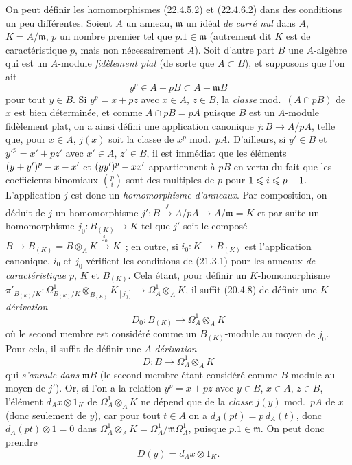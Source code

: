 \begin{remark}[22.4.8]
\label{0.22.4.8-fr}
On peut définir les homomorphismes (22.4.5.2) et (22.4.6.2) dans des conditions
un peu différentes. Soient $A$ un anneau, $\mathfrak m$ un idéal \emph{de carré
nul} dans $A$, $K=A/\mathfrak m$, $p$ un nombre premier tel que
$p.1\in\mathfrak m$ (autrement dit $K$ est de caractéristique $p$, mais non
nécessairement $A$). Soit d'autre part $B$ une $A$-algèbre qui est un $A$-module
\emph{fidèlement plat} (de sorte que $A\subset B$), et supposons que l'on ait
\begin{equation}
\label{0.22.4.8.1-fr}
  y^p\in A+pB\subset A+\mathfrak mB
  \tag{22.4.8.1}
\end{equation}
pour tout $y\in B$. Si $y^p=x+pz$ avec $x\in A$, $z\in B$, la \emph{classe}
mod.~$(A\cap pB)$ de $x$ est bien déterminée, et comme $A\cap pB=pA$ puisque
$B$ est un $A$-module fidèlement plat, on a ainsi défini une application
canonique $j:B\longrightarrow A/pA$, telle que, pour $x\in A$, $j(x)$ soit la
classe de $x^p$ mod.~$pA$. D'ailleurs, si $y'\in B$ et
$y'^p=x'+pz'$ avec $x'\in A$, $z'\in B$, il est immédiat que les éléments
$(y+y')^p- x- x'$ et $(yy')^p- xx'$ appartiennent à $pB$ en vertu du fait que les
coefficients binomiaux $\binom pi$ sont des multiples de $p$ pour
$1\leqslant i\leqslant p- 1$. L'application $j$ est donc un
\emph{homomorphisme d'anneaux}. Par composition, on déduit de $j$ un
homomorphisme $j':B\xrightarrow{j}A/pA\longrightarrow A/\mathfrak m=K$ et par
suite un homomorphisme $j_0:B_{(K)}\longrightarrow K$ tel que $j'$ soit le
composé $B\longrightarrow B_{(K)}=B\otimes_AK\xrightarrow{j_0}K$~; en outre,
si $i_0:K\longrightarrow B_{(K)}$ est l'application canonique, $i_0$ et $j_0$
vérifient les conditions de (21.3.1) pour les anneaux \emph{de caractéristique
$p$}, $K$ et $B_{(K)}$. Cela étant, pour définir un $K$-homomorphisme
$\pi'_{B_{(K)}/K}:\Omega^1_{B_{(K)}/K}\otimes_{B_{(K)}}K_{[j_0]}
\longrightarrow\Omega^1_A\otimes_AK$, il suffit (20.4.8) de définir une
$K$-\emph{dérivation}
\begin{equation}
\label{0.22.4.8.2-fr}
  D_0:B_{(K)}\longrightarrow\Omega^1_A\otimes_AK
  \tag{22.4.8.2}
\end{equation}
où le second membre est considéré comme un $B_{(K)}$-module au moyen de $j_0$.
Pour cela, il suffit de définir une $A$-\emph{dérivation}
\begin{equation}
\label{0.22.4.8.3-fr}
  D:B\longrightarrow\Omega^1_A\otimes_AK
  \tag{22.4.8.3}
\end{equation}
qui \emph{s'annule dans} $\mathfrak mB$ (le second membre étant considéré comme
$B$-module au moyen de $j'$). Or, si l'on a la relation $y^p=x+pz$ avec
$y\in B$, $x\in A$, $z\in B$, l'élément $d_Ax\otimes1_K$ de
$\Omega^1_A\otimes_AK$ ne dépend que de la \emph{classe} $j(y)$ mod.~$pA$ de $x$
(donc seulement de $y$), car pour tout $t\in A$ on a
$d_A(pt)=p\,d_A(t)$, donc $d_A(pt)\otimes1=0$ dans
$\Omega^1_A\otimes_AK=\Omega^1_A/\mathfrak m\Omega^1_A$, puisque
$p.1\in\mathfrak m$. On peut donc prendre
\[
  D(y)=d_Ax\otimes1_K.
\]


\end{remark}
